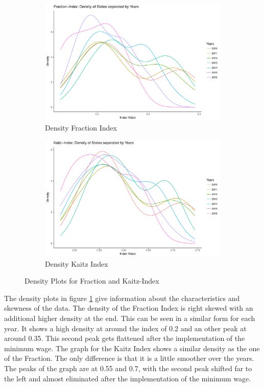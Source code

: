 \documentclass[a4paper]{article}
\begin{document}
{\begin{figure}
\begin{subfigure}[h]{0.5\linewidth}
\includegraphics[width=\textwidth]{q5/densityaggrfraction.pdf}
\caption{Density Fraction Index}
\end{subfigure}
\hfill
\begin{subfigure}[h]{0.5\linewidth}
\includegraphics[width=\textwidth]{q5/densityaggrkaitz.pdf}
\caption{Density Kaitz Index}
\end{subfigure}%
\caption{Density Plots for Fraction and Kaitz-Index}
\label{q5density}
\end{figure}
The density plots in figure \ref{q5density} give information about the characteristics and skewness of the data. The density of the Fraction Index is right skewed with an additional higher density at the end. This can be seen in a similar form for each year. It shows a high density at around the index of 0.2 and an other peak at around 0.35. This second peak gets flattened after the implementation of the minimum wage. The graph for the Kaitz Index shows a similar density as the one of the Fraction. The only difference is that it is a little smoother over the years. The peaks of the graph are at 0.55 and 0.7, with the second peak shifted far to the left and almost eliminated after the implementation of the minimum wage.  

}
\end{document}
